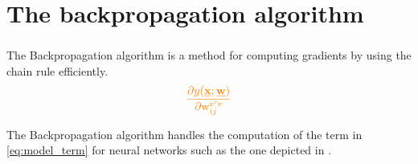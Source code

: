 \section{The backpropagation algorithm}


\begin{frame}\frametitle{\secname}

The Backpropagation algorithm is a method for computing gradients by using the chain rule efficiently.
\begin{equation}
	\textcolor{orange}{	\frac{\partial y(\vec{x}; \vec{w})}{
			\partial \mathrm{w}_{ij}^{v'v}}}
    \label{eq:model_term}
\end{equation}
    
The Backpropagation algorithm handles the computation of the term in \eqref{eq:model_term} for neural networks such as the one depicted in .

\end{frame}

